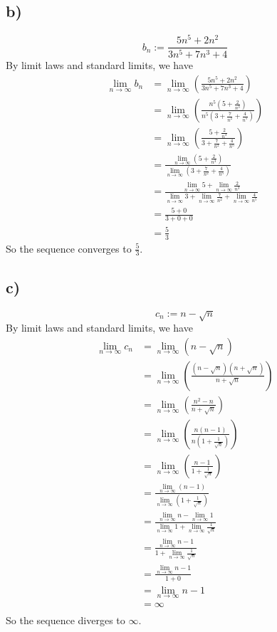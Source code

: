 \documentclass{article}
\newcommand{\limn}{\lim_{n\to\infty}}
\theoremstyle{mytheoremstyle}
\theoremstyle{mytheoremstyle}
\theoremstyle{myproblemstyle}
\begin{document}
    \subsection{b)}
    $$b_n := \frac{5n^5 + 2n^2}{3n^5+7n^3+4}$$
    By limit laws and standard limits, we have
    \begin{align*}
        \limn b_n &= \limn\left(\frac{5n^5 + 2n^2}{3n^5+7n^3+4}\right) \\
        &= \limn\left(\frac{n^5(5 + \frac{2}{n^3})}{n^5(3+\frac{7}{n^2}+\frac{4}{n^5})}\right) \\
        &= \limn\left(\frac{5 + \frac{2}{n^3}}{3+\frac{7}{n^2}+\frac{4}{n^5}}\right) \\
        &= \frac{\limn(5 + \frac{2}{n^3})}{\limn(3+\frac{7}{n^2}+\frac{4}{n^5})} \\
        &= \frac{\limn 5 + \limn\frac{2}{n^3}}{\limn 3+\limn\frac{7}{n^2}+\limn\frac{4}{n^5}} \\
        &= \frac{5 + 0}{3+0+0} \\
        &= \frac{5}{3}
    \end{align*}
    So the sequence converges to $\frac{5}{3}$.
    \subsection{c)}
    $$c_n := n - \sqrt{n}$$
    By limit laws and standard limits, we have
    \begin{align*}
        \limn c_n &= \limn(n - \sqrt{n}) \\
                    &= \limn\left(\frac{(n - \sqrt{n})(n + \sqrt{n})}{n + \sqrt{n}}\right) \\
                    &= \limn\left(\frac{n^2 - n}{n + \sqrt{n}}\right) \\
                    &= \limn\left(\frac{n(n - 1)}{n(1 + \frac{1}{\sqrt{n}})}\right) \\
                    &= \limn\left(\frac{n - 1}{1 + \frac{1}{\sqrt{n}}}\right) \\
                    &= \frac{\limn(n - 1)}{\limn(1 + \frac{1}{\sqrt{n}})} \\
                    &= \frac{\limn n - \limn 1}{\limn 1 + \limn\frac{1}{\sqrt{n}}} \\
                    &= \frac{\limn n - 1}{1 + \limn\frac{1}{\sqrt{n}}} \\
                    &= \frac{\limn n - 1}{1 + 0} \\
                    &= \limn n - 1 \\
                    &= \infty \\
    \end{align*}
    So the sequence diverges to $\infty$.
\end{document}
